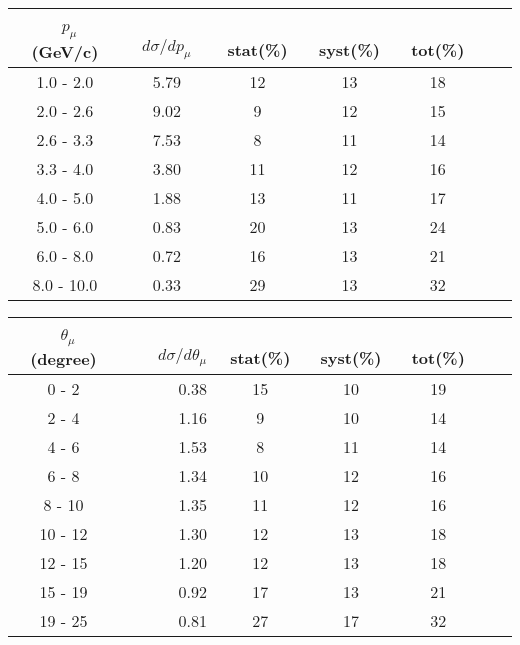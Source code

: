 \documentclass[aps, prd, reprint,showpacs,  preprintnumbers,amsmath,amssymb,superscriptaddress, nofootinbib]{revtex4-1}
\makeatletter
\renewenvironment{table}
  {\def\@captype{table}}
  {}
\makeatother
\begin{document}

\begin{table}
\centering
\begin{tabular}{ccccccc}
\hline
~$p_{\mu}$ (GeV/c) &~~ $d\sigma/dp_{\mu}$ &~ stat(\%) &~ syst(\%) &~ tot(\%)  \\
\hline
  1.0 -   2.0 &   5.79 & 12 & 13 & 18 \\ 
  2.0 -   2.6 &   9.02 & 9 & 12 & 15 \\ 
  2.6 -   3.3 &   7.53 & 8 & 11 & 14 \\ 
  3.3 -   4.0 &   3.80 & 11 & 12 & 16 \\ 
  4.0 -   5.0 &   1.88 & 13 & 11 & 17 \\ 
  5.0 -   6.0 &   0.83 & 20 & 13 & 24 \\ 
  6.0 -   8.0 &   0.72 & 16 & 13 & 21 \\ 
  8.0 -  10.0 &   0.33 & 29 & 13 & 32 \\ 
\hline
\hline
\end{tabular}
\caption{ Flux-averaged differential cross section in muon momentum 
$p_\mu$, $d\sigma/dp_{\mu}(10^{-40}\text{cm}^2/\text{nucleon}/(\text{GeV/c}))$, 
for $\pi^{-}$+nucleon(s) production with statistical (stat), systematic (syst), and total (tot) uncertainties.}
\label{tb:muon-momentum}
\end{table}



\begin{table}
\centering
\begin{tabular}{crccccc}
\hline
~$\theta_{\mu}$ (degree) &~~~ $d\sigma/d\theta_{\mu}$ &~ stat(\%) &~ syst(\%) &~ tot(\%)  \\
\hline
    0 -     2 &   0.38 & 15 & 10 & 19 \\ 
    2 -     4 &   1.16 & 9 & 10 & 14 \\ 
    4 -     6 &   1.53 & 8 & 11 & 14 \\ 
    6 -     8 &   1.34 & 10 & 12 & 16 \\ 
    8 -    10 &   1.35 & 11 & 12 & 16 \\ 
   10 -    12 &   1.30 & 12 & 13 & 18 \\ 
   12 -    15 &   1.20 & 12 & 13 & 18 \\ 
   15 -    19 &   0.92 & 17 & 13 & 21 \\ 
   19 -    25 &   0.81 & 27 & 17 & 32 \\ 
\hline
\hline
\end{tabular}
\caption{ Flux-averaged differential cross section in muon angle 
$\theta_\mu$, $d\sigma/d\theta_{\mu}(10^{-40}\text{cm}^2/\text{nucleon}/\text{degree})$, 
for $\pi^-$+nucleon(s) production with statistical (stat), systematic (syst), and total (tot) uncertainties.}
\label{tb:muon-angle}
\end{table}
\end{document}
